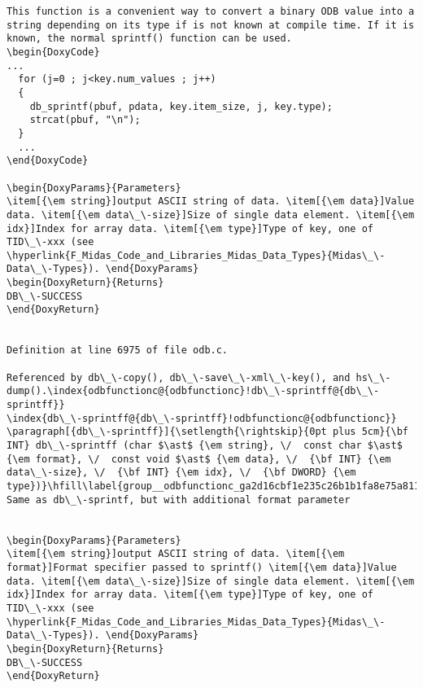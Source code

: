 \begin{DoxyItemize}
\begin{DoxyCode}
\begin{verbatim}
This function is a convenient way to convert a binary ODB value into a string depending on its type if is not known at compile time. If it is known, the normal sprintf() function can be used. 
\begin{DoxyCode}
...
  for (j=0 ; j<key.num_values ; j++)
  {
    db_sprintf(pbuf, pdata, key.item_size, j, key.type);
    strcat(pbuf, "\n");
  }
  ...
\end{DoxyCode}
 
\begin{DoxyParams}{Parameters}
\item[{\em string}]output ASCII string of data. \item[{\em data}]Value data. \item[{\em data\_\-size}]Size of single data element. \item[{\em idx}]Index for array data. \item[{\em type}]Type of key, one of TID\_\-xxx (see \hyperlink{F_Midas_Code_and_Libraries_Midas_Data_Types}{Midas\_\-Data\_\-Types}). \end{DoxyParams}
\begin{DoxyReturn}{Returns}
DB\_\-SUCCESS 
\end{DoxyReturn}


Definition at line 6975 of file odb.c.

Referenced by db\_\-copy(), db\_\-save\_\-xml\_\-key(), and hs\_\-dump().\index{odbfunctionc@{odbfunctionc}!db\_\-sprintff@{db\_\-sprintff}}
\index{db\_\-sprintff@{db\_\-sprintff}!odbfunctionc@{odbfunctionc}}
\paragraph[{db\_\-sprintff}]{\setlength{\rightskip}{0pt plus 5cm}{\bf INT} db\_\-sprintff (char $\ast$ {\em string}, \/  const char $\ast$ {\em format}, \/  const void $\ast$ {\em data}, \/  {\bf INT} {\em data\_\-size}, \/  {\bf INT} {\em idx}, \/  {\bf DWORD} {\em type})}\hfill\label{group__odbfunctionc_ga2d16cbf1e235c26b1b1fa8e75a811d50}
Same as db\_\-sprintf, but with additional format parameter


\begin{DoxyParams}{Parameters}
\item[{\em string}]output ASCII string of data. \item[{\em format}]Format specifier passed to sprintf() \item[{\em data}]Value data. \item[{\em data\_\-size}]Size of single data element. \item[{\em idx}]Index for array data. \item[{\em type}]Type of key, one of TID\_\-xxx (see \hyperlink{F_Midas_Code_and_Libraries_Midas_Data_Types}{Midas\_\-Data\_\-Types}). \end{DoxyParams}
\begin{DoxyReturn}{Returns}
DB\_\-SUCCESS 
\end{DoxyReturn}



\end{verbatim}
\end{DoxyCode}
\end{DoxyItemize}
